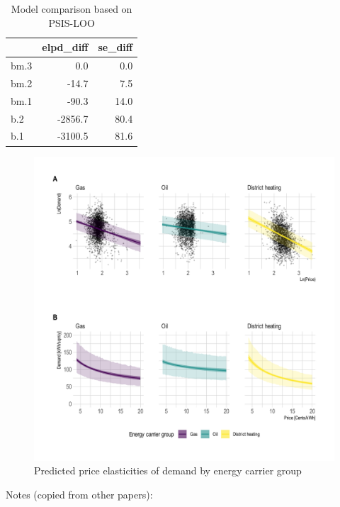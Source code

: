 \documentclass[12pt,twoside]{reedthesis}
\begin{document}
\begin{table}[]
\centering
\caption{Model comparison based on PSIS-LOO}
\label{tab:model-comparison}
\begin{tabular}{@{}lrr@{}}
\toprule
     & \multicolumn{1}{l}{elpd\_diff} & \multicolumn{1}{l}{se\_diff} \\ \midrule
bm.3 & 0.0                            & 0.0                          \\
bm.2 & -14.7                          & 7.5                          \\
bm.1 & -90.3                          & 14.0                         \\
b.2  & -2856.7                        & 80.4                         \\
b.1  & -3100.5                        & 81.6                         \\ \bottomrule
\end{tabular}
\end{table}
\begin{figure}

{\centering \includegraphics[width=1.04\linewidth]{figure/elasticity_predictions_subsample} 

}

\caption{Predicted price elasticities of demand by energy carrier group}\label{fig:elasticity-predictions-energy-carrier}
\end{figure}
Notes (copied from other papers):
\end{document}
